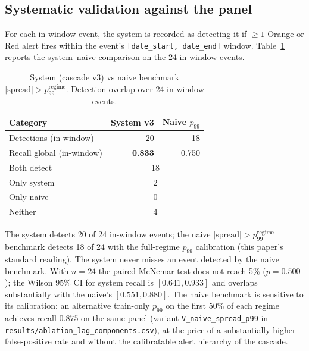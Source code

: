 \documentclass[11pt,a4paper]{article}
\begin{document}
\subsection{Systematic validation against the panel}\label{sec:event-validation}

For each in-window event, the system is recorded as detecting it if
$\geq 1$ Orange or Red alert fires within the event's
\texttt{[date\_start, date\_end]} window. Table~\ref{tab:t7}
reports the system--naive comparison on the 24 in-window events.

\begin{table}[H]
\centering
\small
\caption{System (cascade v3) vs naive benchmark
$|\mathrm{spread}| > p_{99}^{\text{regime}}$. Detection overlap
over 24 in-window events.}
\label{tab:t7}
\begin{tabular}{lrr}
\toprule
\textbf{Category} & \textbf{System v3} & \textbf{Naive $p_{99}$} \\
\midrule
Detections (in-window)   & 20 & 18 \\
Recall global (in-window) & \textbf{0.833} & 0.750 \\
\midrule
Both detect                      & \multicolumn{2}{c}{18} \\
Only system                      & \multicolumn{2}{c}{2} \\
Only naive                       & \multicolumn{2}{c}{0} \\
Neither                          & \multicolumn{2}{c}{4} \\
\bottomrule
\end{tabular}
\end{table}

The system detects 20 of 24 in-window events; the naive
$|\mathrm{spread}| > p_{99}^{\text{regime}}$ benchmark detects 18 of
24 with the full-regime $p_{99}$ calibration (this paper's standard
reading). The system never misses an event detected by the naive
benchmark. With $n = 24$ the paired McNemar test does not reach 5\%
($p = 0.500$); the Wilson 95\% CI for system recall is
$[0.641, 0.933]$ and overlaps substantially with the naive's
$[0.551, 0.880]$. The naive benchmark is sensitive to its
calibration: an alternative train-only $p_{99}$ on the first 50\% of
each regime achieves recall $0.875$ on the same panel (variant
\texttt{V\_naive\_spread\_p99} in
\texttt{results/ablation\_lag\_components.csv}), at the price of a
substantially higher false-positive rate and without the
calibratable alert hierarchy of the cascade.
\end{document}
